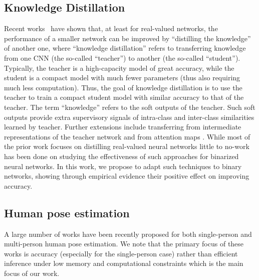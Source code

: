 \documentclass[10pt,twocolumn,letterpaper]{article}
\begin{document}
\subsection{Knowledge Distillation}\label{ssec:related-knowledge distillation}
Recent works~\cite{hinton2015distilling} have shown that, at least for real-valued networks, the performance of a smaller network can be improved by ``distilling the knowledge'' of another one, where ``knowledge distillation'' refers to transferring knowledge from one CNN (the so-called ``teacher'') to another (the so-called ``student''). Typically, the teacher is a high-capacity model of great accuracy, while the student is a compact model with much fewer parameters (thus also requiring much less computation).
Thus, the goal of knowledge distillation is to use the teacher to train a compact student model with similar accuracy to that of the teacher. The term ``knowledge'' refers to the soft outputs of the teacher. Such soft outputs provide extra supervisory signals of intra-class and inter-class similarities learned by teacher. Further extensions include transferring from intermediate representations of the teacher network \cite{romero2015fitnets} and from attention maps \cite{zagoruyko2017paying}. While most of the prior work focuses on distilling real-valued neural networks little to no-work has been done on studying the effectiveness of such approaches for binarized neural networks. In this work, we propose to adapt such techniques to binary networks, showing through empirical evidence their positive effect on improving accuracy. 







\subsection{Human pose estimation}\label{ssec:related-human-pose}

A large number of works have been recently proposed for both single-person \cite{newell2016stacked,wei2016convolutional,bulat2016human,ke2018multi,tang2018deeply,chu2017multi,yang2017learning,chen2017adversarial} and multi-person \cite{cao2017realtime, papandreou2017towards, he2017mask, girdhar2018detect} human pose estimation. We note that the primary focus of these works is accuracy (especially for the single-person case) rather than efficient inference under low memory and computational constraints which is the main focus of our work.
\end{document}
